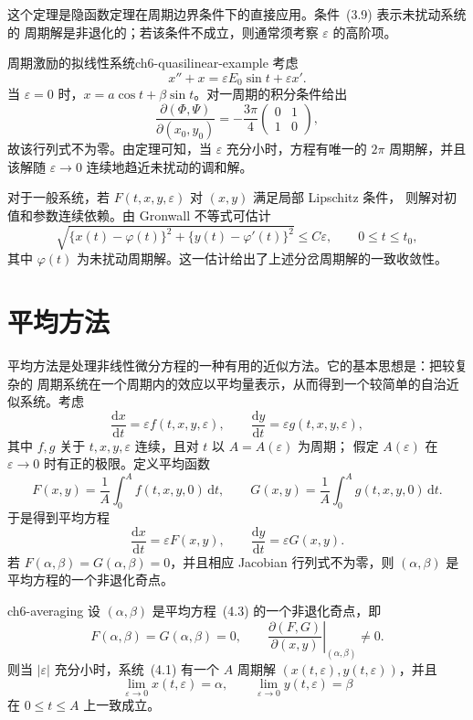 这个定理是隐函数定理在周期边界条件下的直接应用。条件~(3.9) 表示未扰动系统的
周期解是非退化的；若该条件不成立，则通常须考察 $\varepsilon$ 的高阶项。

\begin{example}{周期激励的拟线性系统}{ch6-quasilinear-example}
考虑
\[
  x''+x=\varepsilon E_0\sin t+\varepsilon x'. \tag{3.10}
\]
当 $\varepsilon=0$ 时，$x=a\cos t+\beta\sin t$。对一周期的积分条件给出
\[
  \frac{\partial(\Phi,\Psi)}{\partial(x_0,y_0)}
  =-\frac{3\pi}{4}
  \begin{pmatrix}0&1\\1&0\end{pmatrix},
\]
故该行列式不为零。由定理可知，当 $\varepsilon$ 充分小时，方程有唯一的
$2\pi$ 周期解，并且该解随 $\varepsilon\to0$ 连续地趋近未扰动的调和解。
\end{example}

对于一般系统，若 $F(t,x,y,\varepsilon)$ 对 $(x,y)$ 满足局部 Lipschitz 条件，
则解对初值和参数连续依赖。由 Gronwall 不等式可估计
\[
  \sqrt{\{x(t)-\varphi(t)\}^2+\{y(t)-\varphi'(t)\}^2}
  \leq C\varepsilon,\qquad 0\leq t\leq t_0, \tag{3.18}
\]
其中 $\varphi(t)$ 为未扰动周期解。这一估计给出了上述分岔周期解的一致收敛性。

\section{平均方法}

平均方法是处理非线性微分方程的一种有用的近似方法。它的基本思想是：把较复杂的
周期系统在一个周期内的效应以平均量表示，从而得到一个较简单的自治近似系统。考虑
\[
  \frac{\mathrm dx}{\mathrm dt}=\varepsilon f(t,x,y,\varepsilon),\qquad
  \frac{\mathrm dy}{\mathrm dt}=\varepsilon g(t,x,y,\varepsilon), \tag{4.1}
\]
其中 $f,g$ 关于 $t,x,y,\varepsilon$ 连续，且对 $t$ 以 $A=A(\varepsilon)$ 为周期；
假定 $A(\varepsilon)$ 在 $\varepsilon\to0$ 时有正的极限。定义平均函数
\[
  F(x,y)=\frac1A\int_0^A f(t,x,y,0)\,\mathrm dt,
  \qquad
  G(x,y)=\frac1A\int_0^A g(t,x,y,0)\,\mathrm dt. \tag{4.2}
\]
于是得到平均方程
\[
  \frac{\mathrm dx}{\mathrm dt}=\varepsilon F(x,y),\qquad
  \frac{\mathrm dy}{\mathrm dt}=\varepsilon G(x,y). \tag{4.3}
\]
若 $F(\alpha,\beta)=G(\alpha,\beta)=0$，并且相应 Jacobian 行列式不为零，则
$(\alpha,\beta)$ 是平均方程的一个非退化奇点。

\begin{theorem}{}{ch6-averaging}
设 $(\alpha,\beta)$ 是平均方程~(4.3) 的一个非退化奇点，即
\[
  F(\alpha,\beta)=G(\alpha,\beta)=0,\qquad
  \left.\frac{\partial(F,G)}{\partial(x,y)}\right|_{(\alpha,\beta)}\ne0. \tag{4.4}
\]
则当 $|\varepsilon|$ 充分小时，系统~(4.1) 有一个 $A$ 周期解
$(x(t,\varepsilon),y(t,\varepsilon))$，并且
\[
  \lim_{\varepsilon\to0}x(t,\varepsilon)=\alpha,\qquad
  \lim_{\varepsilon\to0}y(t,\varepsilon)=\beta
\]
在 $0\leq t\leq A$ 上一致成立。
\end{theorem}

